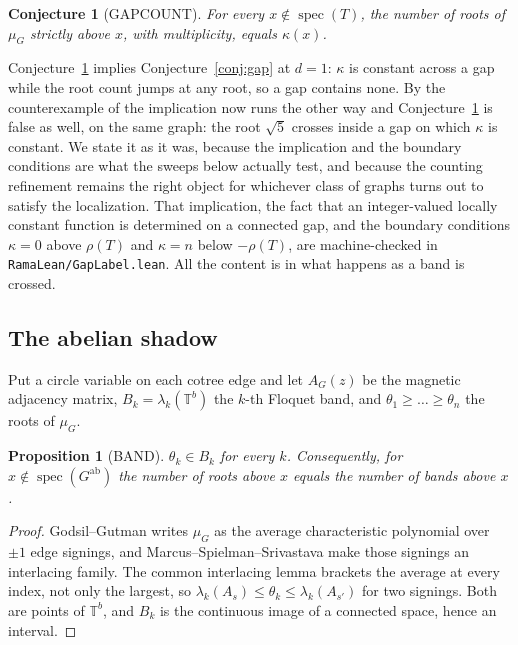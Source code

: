 \documentclass[11pt]{article}
\newtheorem{conjecture}[theorem]{Conjecture}
\newtheorem{proposition}[theorem]{Proposition}
\theoremstyle{remark}
\begin{document}
\begin{conjecture}[GAPCOUNT]\label{conj:gapcount}
For every $x\notin\operatorname{spec}(T)$, the number of roots of $\mu_G$ strictly above
$x$, with multiplicity, equals $\kappa(x)$.
\end{conjecture}

Conjecture~\ref{conj:gapcount} implies Conjecture~\ref{conj:gap} at $d=1$: $\kappa$ is
constant across a gap while the root count jumps at any root, so a gap contains none.
By the counterexample of \cite{HallCE} the implication now runs the other way and
Conjecture~\ref{conj:gapcount} is false as well, on the same graph: the root $\sqrt5$
crosses inside a gap on which $\kappa$ is constant. We state it as it was, because the
implication and the boundary conditions are what the sweeps below actually test, and
because the counting refinement remains the right object for whichever class of graphs
turns out to satisfy the localization. That
implication, the fact that an integer-valued locally constant function is determined on a
connected gap, and the boundary conditions $\kappa=0$ above $\rho(T)$ and $\kappa=n$ below
$-\rho(T)$, are machine-checked in \texttt{RamaLean/GapLabel.lean}. All the content is in
what happens as a band is crossed.

\subsection{The abelian shadow}

Put a circle variable on each cotree edge and let $A_G(z)$ be the magnetic adjacency matrix,
$B_k=\lambda_k(\mathbb T^b)$ the $k$-th Floquet band, and $\theta_1\ge\dots\ge\theta_n$ the
roots of $\mu_G$.

\begin{proposition}[BAND]\label{prop:band}
$\theta_k\in B_k$ for every $k$. Consequently, for $x\notin\operatorname{spec}(G^{\mathrm{ab}})$
the number of roots above $x$ equals the number of bands above $x$.
\end{proposition}

\begin{proof}
Godsil--Gutman writes $\mu_G$ as the average characteristic polynomial over $\pm1$ edge
signings, and Marcus--Spielman--Srivastava \cite{MSS} make those signings an interlacing
family. The common interlacing lemma brackets the average at every index, not only the
largest, so $\lambda_k(A_s)\le\theta_k\le\lambda_k(A_{s'})$ for two signings. Both are points
of $\mathbb T^b$, and $B_k$ is the continuous image of a connected space, hence an interval.
\end{proof}
\end{document}
